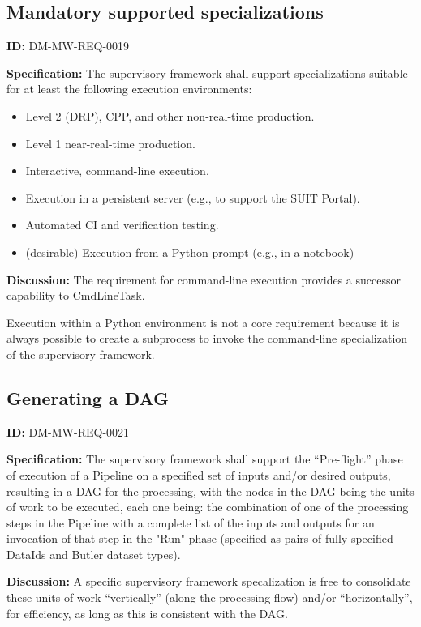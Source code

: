 \documentclass[SE,toc,lsstdraft]{lsstdoc}
\begin{document}
\subsection{Mandatory supported specializations}

\label{DM-MW-REQ-0019}
\textbf{ID:} DM-MW-REQ-0019

\textbf{Specification:}
The supervisory framework shall support specializations suitable for at least the following execution environments:

    \begin{itemize}
\item
Level 2 (DRP), CPP, and other non-real-time production.

\item
Level 1 near-real-time production.

\item
Interactive, command-line execution.

\item
Execution in a persistent server (e.g., to support the SUIT Portal).

\item
Automated CI and verification testing.

\item
(desirable) Execution from a Python prompt (e.g., in a notebook)

    \end{itemize}

\textbf{Discussion:}
The requirement for command-line execution provides a successor capability to CmdLineTask.

Execution within a Python environment is not a core requirement because it is always possible to create a subprocess to invoke the command-line specialization of the supervisory framework.

\subsection{Generating a DAG}

\label{DM-MW-REQ-0021}
\textbf{ID:} DM-MW-REQ-0021

\textbf{Specification:}
The supervisory framework shall support the “Pre-flight” phase of execution of a Pipeline on a specified set of inputs and/or desired outputs, resulting in a DAG for the processing, with the nodes in the DAG being the units of work to be executed, each one being: the combination of one of the processing steps in the Pipeline with a complete list of the inputs and outputs for an invocation of that step in the "Run" phase (specified as pairs of fully specified DataIds and Butler dataset types).

\textbf{Discussion:}
A specific supervisory framework specalization is free to consolidate these units of work “vertically” (along the processing flow) and/or “horizontally”, for efficiency, as long as this is consistent with the DAG.


\end{document}
